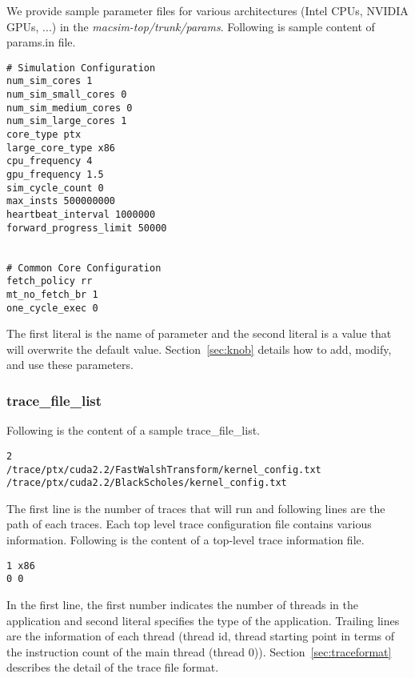 We provide sample parameter files for various architectures (Intel
CPUs, NVIDIA GPUs, ...) in
the \textit{macsim-top/trunk/params}. Following is sample content of
params.in file.

\smallskip
\begin{lstlisting}
# Simulation Configuration
num_sim_cores 1
num_sim_small_cores 0
num_sim_medium_cores 0
num_sim_large_cores 1
core_type ptx
large_core_type x86
cpu_frequency 4
gpu_frequency 1.5
sim_cycle_count 0
max_insts 500000000
heartbeat_interval 1000000
forward_progress_limit 50000


# Common Core Configuration
fetch_policy rr
mt_no_fetch_br 1
one_cycle_exec 0
\end{lstlisting}
\smallskip

The first literal is the name of parameter and the second literal is a
value that will overwrite the default value. Section~\ref{sec:knob}
details how to add, modify, and use these parameters.


\subsubsection{trace\_file\_list}
\label{sec:trace_file_list}

Following is the content of a sample trace\_file\_list.

\smallskip
\begin{lstlisting}
2
/trace/ptx/cuda2.2/FastWalshTransform/kernel_config.txt
/trace/ptx/cuda2.2/BlackScholes/kernel_config.txt
\end{lstlisting}
\smallskip

The first line is the number of traces that \SIM will run and
following lines are the path of each traces. Each top level trace
configuration file contains various information. Following is the
content of a top-level trace information file.


\smallskip
\begin{lstlisting}
1 x86
0 0
\end{lstlisting}
\smallskip

In the first line, the first number indicates the number of threads in
the application and second literal specifies the type of the
application. Trailing lines are the information of each thread
({thread id}, {thread starting point in terms of the instruction count
of the main thread (thread 0)}). Section~\ref{sec:traceformat}
describes the detail of the trace file format.



